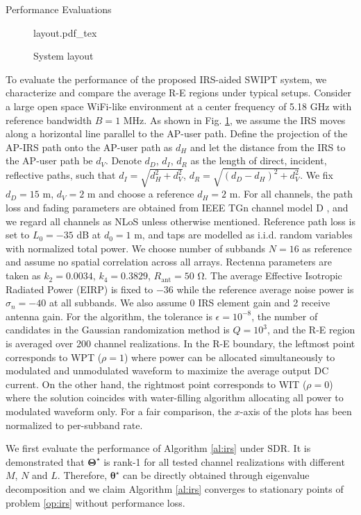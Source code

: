 \documentclass{IEEEtran}
\begin{document}
\begin{section}{Performance Evaluations}\label{se:performance_evaluation}
	\begin{figure}
		\centering
		\def\svgwidth{\columnwidth}
		{layout.pdf_tex}
		\caption{System layout}
		\label{fi:layout}
	\end{figure}
	To evaluate the performance of the proposed IRS-aided SWIPT system, we characterize and compare the average R-E regions under typical setups. Consider a large open space WiFi-like environment at a center frequency of 5.18 \si{\GHz} with reference bandwidth $B=1$ \si{\MHz}. As shown in Fig. \ref{fi:layout}, we assume the IRS moves along a horizontal line parallel to the AP-user path. Define the projection of the AP-IRS path onto the AP-user path as $d_H$ and let the distance from the IRS to the AP-user path be $d_V$. Denote $d_D$, $d_I$, $d_R$ as the length of direct, incident, reflective paths, such that $d_I=\sqrt{d_H^2+d_V^2}$, $d_R=\sqrt{(d_D-d_H)^2+d_V^2}$. We fix $d_D=15$ \si{\meter}, $d_V=2$ \si{\meter} and choose a reference $d_H=2$ \si{\meter}. For all channels, the path loss and fading parameters are obtained from IEEE TGn channel model D \cite{Erceg2004}, and we regard all channels as NLoS unless otherwise mentioned. Reference path loss is set to $L_0=-35$ \si{\dB} at $d_0=1$ \si{\meter}, and taps are modelled as i.i.d. random variables with normalized total power. We choose number of subbands $N=16$ as reference and assume no spatial correlation across all arrays. Rectenna parameters are taken as $k_2=0.0034$, $k_4=0.3829$, $R_{\text{ant}}=50$ \si{\ohm}. The average Effective Isotropic Radiated Power (EIRP) is fixed to $-36$ \si{\dBm} while the reference average noise power is $\sigma_n=-40$ \si{\dBm} at all subbands. We also assume 0 \si{\dBi} IRS element gain and 2 \si{\dBi} receive antenna gain. For the algorithm, the tolerance is $\epsilon=10^{-8}$, the number of candidates in the Gaussian randomization method is $Q=10^{3}$, and the R-E region is averaged over 200 channel realizations. In the R-E boundary, the leftmost point corresponds to WPT ($\rho=1$) where power can be allocated simultaneously to modulated and unmodulated waveform to maximize the average output DC current. On the other hand, the rightmost point corresponds to WIT ($\rho=0$) where the solution coincides with water-filling algorithm allocating all power to modulated waveform only. For a fair comparison, the $x$-axis of the plots has been normalized to per-subband rate.

	We first evaluate the performance of Algorithm \ref{al:irs} under SDR. It is demonstrated that $\boldsymbol{\Theta}^{\star}$ is rank-1 for all tested channel realizations with different $M$, $N$ and $L$. Therefore, $\boldsymbol{\theta}^{\star}$ can be directly obtained through eigenvalue decomposition and we claim Algorithm \ref{al:irs} converges to stationary points of problem \ref{op:irs} without performance loss.


\end{section}
\end{document}
